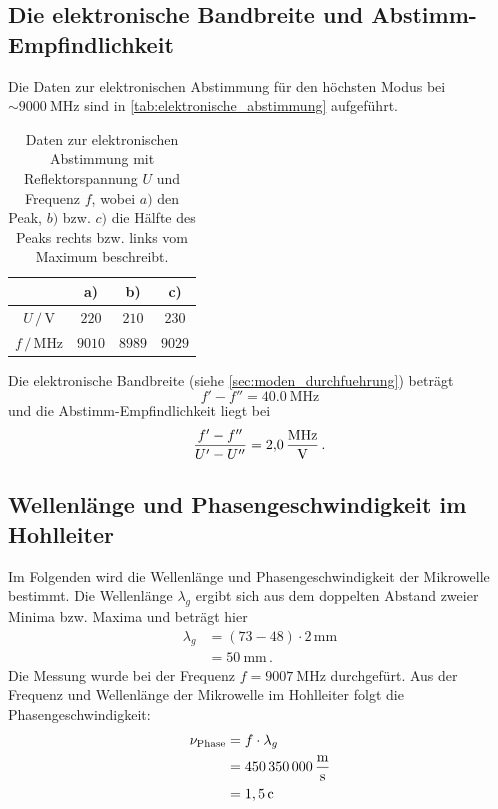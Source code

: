 \subsection{Die elektronische Bandbreite und Abstimm-Empfindlichkeit}
Die Daten zur elektronischen Abstimmung für den höchsten Modus bei $\sim \SI{9000}{\mega\hertz}$ sind in \autoref{tab:elektronische_abstimmung} aufgeführt.
\begin{table}
    \centering
    \caption{Daten zur elektronischen Abstimmung mit Reflektorspannung $U$ und Frequenz $f$, wobei $a)$ den Peak, $b)$ bzw. $c)$ die Hälfte des Peaks rechts bzw. links vom Maximum beschreibt.}
    \begin{tabular}{c c c c}
        \toprule
        & a) & b) & c) \\
        \midrule
        $U \,/\, \si{\volt}$ & $220$ & $210$ & $230$ \\
        $f \,/\, \si{\mega\hertz}$ & $9010$ & $8989$ & $9029$ \\
    \end{tabular}
    \label{tab:elektronische_abstimmung}
\end{table}
Die elektronische Bandbreite (siehe \autoref{sec:moden_durchfuehrung}) beträgt
\begin{equation*}
    f' - f'' = \SI{40.0}{\mega\hertz}
\end{equation*}
und die Abstimm-Empfindlichkeit liegt bei
\begin{equation*}
    \frac{f' - f''}{U' - U''} = \SI{2.0}{\frac{\mega\hertz}{\volt}} \, .
\end{equation*}
\FloatBarrier

\subsection{Wellenlänge und Phasengeschwindigkeit im Hohlleiter}
\label{sec:ausw_frequenz}
Im Folgenden wird die Wellenlänge und Phasengeschwindigkeit der Mikrowelle bestimmt.
Die Wellenlänge $\lambda_g$ ergibt sich aus dem doppelten Abstand zweier Minima bzw. Maxima und beträgt hier
\begin{align*}
    \lambda_g &= (73 - 48) \cdot 2 \, \si{\milli \metre} \\
    &= \SI{50}{\milli \metre} \, .
\end{align*}
Die Messung wurde bei der Frequenz $f = \SI{9007}{\mega\hertz}$ durchgefürt.
Aus der Frequenz und Wellenlänge der Mikrowelle im Hohlleiter folgt die Phasengeschwindigkeit:
\begin{align*}
    \nu_\text{Phase} &= f \cdot \lambda_g \\
    &= \SI{450350000}{\frac{\metre}{\second}} \\
    &= 1,5 \, \mathrm{c} \\
\end{align*}
\FloatBarrier

